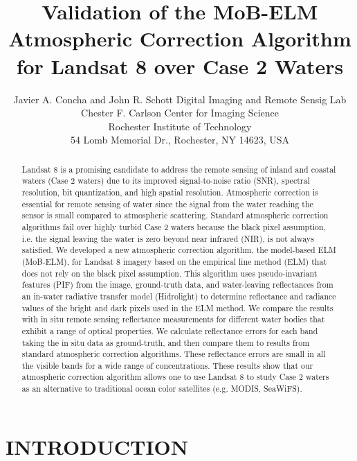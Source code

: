 \documentclass[draft]{spie}  %
\title{Validation of the MoB-ELM Atmospheric Correction Algorithm for Landsat 8 over Case 2 Waters}
\author{Javier A. Concha and John R. Schott
\skiplinehalf
Digital Imaging and Remote Sensig Lab\\Chester F. Carlson Center for Imaging Science\\Rochester Institute of Technology\\ 54 Lomb Memorial Dr., Rochester, NY 14623, USA\\
}
\begin{document}
 
  \maketitle 

\begin{abstract}
Landsat 8 is a promising candidate to address the remote sensing of inland and coastal waters (Case 2 waters) due to its improved signal-to-noise ratio (SNR), spectral resolution, bit quantization, and high spatial resolution. Atmospheric correction is essential for remote sensing of water since the signal from the water reaching the sensor is small compared to atmospheric scattering. Standard atmospheric correction algorithms fail over highly turbid Case 2 waters because the black pixel assumption, i.e. the signal leaving the water is zero beyond near infrared (NIR), is not always satisfied. We developed a new atmospheric correction algorithm, the model-based ELM (MoB-ELM), for Landsat 8 imagery based on the empirical line method (ELM) that does not rely on the black pixel assumption. This algorithm uses pseudo-invariant features (PIF) from the image, ground-truth data, and water-leaving reflectances from an in-water radiative transfer model (Hidrolight) to determine reflectance and radiance values of the bright and dark pixels used in the ELM method.  We compare the results with in situ remote sensing reflectance measurements for different water bodies that exhibit a range of optical properties. We calculate reflectance errors for each band taking the in situ data as ground-truth, and then compare them to results from standard atmospheric correction algorithms. These reflectance errors are small in all the visible bands for a wide range of concentrations. These results show that our atmospheric correction algorithm allows one to use Landsat 8 to study Case 2 waters as an alternative to traditional ocean color satellites (e.g. MODIS, SeaWiFS). 
\end{abstract}



\section{INTRODUCTION}
\label{sec:intro}  %
\end{document}
